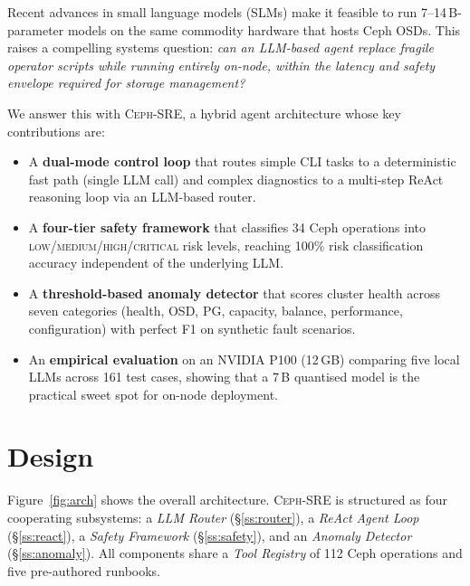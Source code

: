 \documentclass[sigplan,nonacm,10pt]{acmart}
\newcommand{\sysname}{\textsc{Ceph-SRE}\xspace}
\begin{document}
Recent advances in small language models (SLMs) make it feasible to
run 7--14\,B-parameter models on the same commodity hardware that
hosts Ceph OSDs.
This raises a compelling systems question: \emph{can an LLM-based
agent replace fragile operator scripts while running entirely on-node,
within the latency and safety envelope required for storage
management?}

We answer this with \sysname, a hybrid agent architecture whose key
contributions are:
\begin{itemize}
  \item A \textbf{dual-mode control loop} that routes simple CLI tasks
    to a deterministic fast path (single LLM call) and complex
    diagnostics to a multi-step ReAct~\cite{yao2023react} reasoning
    loop via an LLM-based router.
  \item A \textbf{four-tier safety framework} that classifies 34
    Ceph operations into \textsc{low}/\textsc{medium}/\textsc{high}/\textsc{critical}
    risk levels, reaching 100\% risk classification accuracy
    independent of the underlying LLM.
  \item A \textbf{threshold-based anomaly detector} that scores
    cluster health across seven categories (health, OSD, PG,
    capacity, balance, performance, configuration) with perfect
    F1 on synthetic fault scenarios.
  \item An \textbf{empirical evaluation} on an NVIDIA P100 (12\,GB)
    comparing five local LLMs across 161 test cases, showing that
    a 7\,B quantised model is the practical sweet spot
    for on-node deployment.
\end{itemize}


\section{Design}\label{sec:design}

Figure~\ref{fig:arch} shows the overall architecture.
\sysname is structured as four cooperating subsystems:
a \emph{LLM Router} (\S\ref{ss:router}),
a \emph{ReAct Agent Loop} (\S\ref{ss:react}),
a \emph{Safety Framework} (\S\ref{ss:safety}), and
an \emph{Anomaly Detector} (\S\ref{ss:anomaly}).
All components share a \emph{Tool Registry} of 112 Ceph operations
and five pre-authored runbooks.
\end{document}

